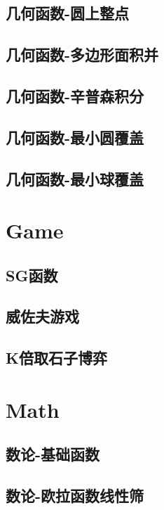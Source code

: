 \documentclass[UTF8]{ctexart}
\begin{document}
\begin{CJK}{UTF8}{<font>}
\begin{spacing}{0.80}
\subsection{几何函数-圆上整点} 
\subsection{几何函数-多边形面积并} 
\subsection{几何函数-辛普森积分} 
\subsection{几何函数-最小圆覆盖} 
\subsection{几何函数-最小球覆盖} 
\section{Game}
\subsection{SG函数} 
\subsection{威佐夫游戏} 
\subsection{K倍取石子博弈} 
\section{Math}
\subsection{数论-基础函数} 
\subsection{数论-欧拉函数线性筛} 

\end{spacing}
\end{CJK}
\end{document}
